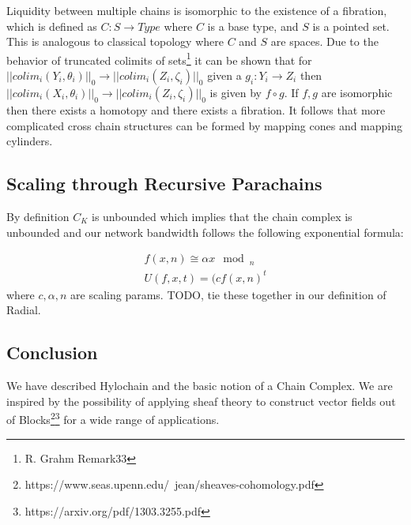 \documentclass{article}
\begin{document}
Liquidity between multiple chains is isomorphic to the existence of a fibration, which is defined as $C: S \rightarrow Type$ where $C$ is a base type, and $S$ is a pointed set. This is analogous to classical topology where $C$ and $S$ are spaces. Due to the behavior of truncated colimits of sets\footnote{R. Grahm Remark33} it can be shown that for $ || colim_i (Y_i,\theta_i) ||_0 \rightarrow || colim_i (Z_i,\zeta_i) ||_0$ given a $g_i: Y_i  \rightarrow Z_i$ then $|| colim_i (X_i,\theta_i) ||_0 \rightarrow || colim_i (Z_i,\zeta_i) ||_0$ is given by $f \circ g$. If $f,g$ are isomorphic then there exists a homotopy and there exists a fibration. It follows that more complicated cross chain structures can be formed by mapping cones and mapping cylinders.

\subsection{Scaling through Recursive Parachains}
By definition $C_K$ is unbounded which implies that the chain complex is unbounded and our network bandwidth follows the following exponential formula:

\begin{equation} \label{eq1}
\begin{split}
f(x, n) \cong \alpha x \mod_n \\
U(f, x, t) = (c f(x, n)^t
\end{split}
\end{equation}
where $c, \alpha, n$ are scaling params. TODO, tie these together in our definition of Radial.

\subsection{Conclusion}
We have described Hylochain and the basic notion of a Chain Complex. We are inspired by the possibility of applying sheaf theory to construct vector fields out of Blocks\footnote{https://www.seas.upenn.edu/~jean/sheaves-cohomology.pdf}\footnote{https://arxiv.org/pdf/1303.3255.pdf} for a wide range of applications.


\end{document}
